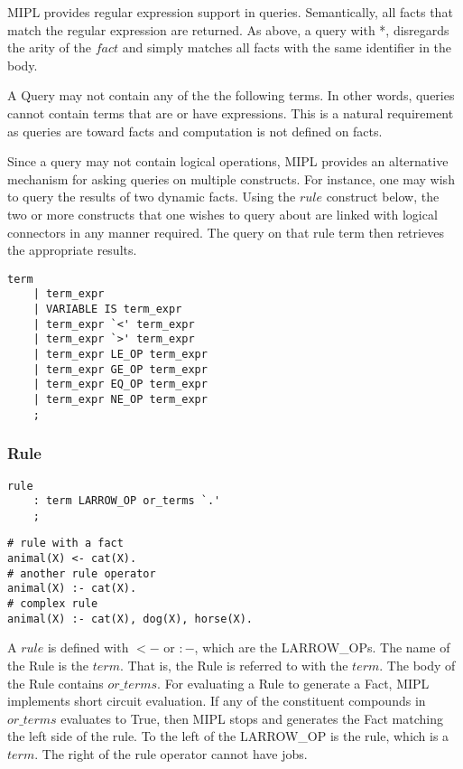 \documentclass[prodmode,acmtecs]{acmsmall}
\begin{document}
MIPL provides regular expression support in queries. Semantically, all facts that match 
the regular expression are returned. As above, a query with *, disregards the arity of the
$fact$ and simply matches all facts with the same identifier in the body.

A Query may not contain any of the the following terms. In other words, queries cannot
contain terms that are or have expressions. This is a natural requirement as queries 
are toward facts and computation is not defined on facts.

Since a query may not contain logical operations, MIPL provides an alternative mechanism for 
asking queries on multiple constructs. For instance, one may wish to query the results of two 
dynamic facts. Using the $rule$ construct below, the two or more constructs that one wishes to 
query about are linked with logical connectors in any manner required. The query on that rule term
then retrieves the appropriate results.

\begin{lstlisting}
term	
	| term_expr		
	| VARIABLE IS term_expr
	| term_expr `<' term_expr
	| term_expr `>' term_expr
	| term_expr LE_OP term_expr
	| term_expr GE_OP term_expr
	| term_expr EQ_OP term_expr
	| term_expr NE_OP term_expr
	;
\end{lstlisting}
\medskip

\subsubsection{Rule}
\begin{lstlisting}
rule
	: term LARROW_OP or_terms `.'
	;
\end{lstlisting}

\begin{lstlisting}
# rule with a fact
animal(X) <- cat(X).
# another rule operator
animal(X) :- cat(X).
# complex rule
animal(X) :- cat(X), dog(X), horse(X).
\end{lstlisting}

A $rule$ is defined with $<-$ or $:-$, which are the LARROW\_OPs. The name of the 
Rule is the $term$. That is, the Rule is referred to with the $term$.
The body of the Rule contains $or\_terms$. For evaluating a Rule to generate a Fact,
MIPL implements short circuit evaluation. If any of the constituent compounds in
$or\_terms$ evaluates to True, then MIPL stops and generates the Fact matching the
left side of the rule. To the left of the LARROW\_OP is the rule, which is a $term$. 
The right of the rule operator cannot have jobs.
\end{document}
